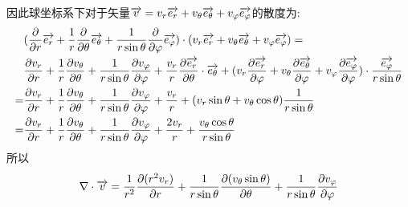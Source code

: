 因此球坐标系下对于矢量$\overrightarrow{v}=v_r\overrightarrow{e_r}+v_{\theta}\overrightarrow{e_{\theta}}+v_{\varphi}\overrightarrow{e_{\varphi}}$的散度为:
\begin{align*}
&(\frac{\partial }{\partial r} \overrightarrow{e_r} + \frac{1}{r} \frac{\partial}{\partial \theta} \overrightarrow{e_{\theta}}+\frac{1}{r\sin\theta}
\frac{\partial }{\partial \varphi}\overrightarrow{e_{\varphi}})\cdot (v_r\overrightarrow{e_r}+v_{\theta}\overrightarrow{e_{\theta}}+v_{\varphi}\overrightarrow{e_{\varphi}}) =\\
&\frac{\partial v_r}{\partial r}+\frac{1}{r}\frac{\partial v_{\theta}}{\partial \theta}+\frac{1}{r\sin\theta}
\frac{\partial v_{\varphi}}{\partial \varphi} +\frac{v_r}{r}\frac{\partial \overrightarrow{e_r}}{\partial \theta}\cdot \overrightarrow{e_{\theta}}+
(v_r\frac{\partial \overrightarrow{e_r}}{\partial \varphi}+v_{\theta}\frac{\partial \overrightarrow{e_{\theta}}}{\partial \varphi}+
v_{\varphi}\frac{\partial \overrightarrow{e_{\varphi}}}{\partial \varphi})\cdot \frac{\overrightarrow{e_{\varphi}}}{r \sin\theta}\\
=&\frac{\partial v_r}{\partial r}+\frac{1}{r}\frac{\partial v_{\theta}}{\partial \theta}+\frac{1}{r\sin\theta}
\frac{\partial v_{\varphi}}{\partial \varphi} +\frac{v_r}{r}+
(v_r\sin\theta+v_{\theta}\cos\theta)\frac{1}{r \sin\theta}\\
=&\frac{\partial v_r}{\partial r}+\frac{1}{r}\frac{\partial v_{\theta}}{\partial \theta}+\frac{1}{r\sin\theta}
\frac{\partial v_{\varphi}}{\partial \varphi} +\frac{2v_r}{r}+\frac{v_{\theta}\cos\theta}{r \sin\theta}
\end{align*}
所以
\begin{equation}
\nabla \cdot \overrightarrow{v}=\frac{1}{r^2}\frac{\partial (r^2 v_r)}{\partial r}+
\frac{1}{r\sin\theta}\frac{\partial (v_{\theta}\sin\theta)}{\partial \theta}+
\frac{1}{r\sin\theta}\frac{\partial v_{\varphi}}{\partial \varphi} 
\end{equation}
\begin{equation}
\end{equation}
